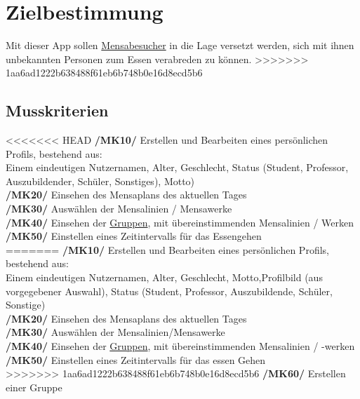 \documentclass[a4paper]{scrreprt}
\begin{document}
\chapter{Zielbestimmung}
Mit dieser App sollen \hyperlink{label1}{Mensabesucher} in die Lage versetzt werden, sich mit ihnen unbekannten Personen zum Essen verabreden zu können.
>>>>>>> 1aa6ad1222b638488f61eb6b748b0e16d8ecd5b6
 
\section{Musskriterien}

\begin{addmargin}[25pt]{0pt} 
<<<<<<< HEAD
\hypertarget{mk10}{\textbf{/MK10/}} Erstellen und Bearbeiten eines persönlichen Profils, bestehend aus: \\ Einem eindeutigen Nutzernamen, Alter, Geschlecht, Status (Student, Professor, Auszubildender, Schüler, Sonstiges), Motto)\\
\hypertarget{mk20}{\textbf{/MK20/}} Einsehen des Mensaplans des aktuellen Tages\\
\hypertarget{mk30}{\textbf{/MK30/}} Auswählen der Mensalinien / Mensawerke\\
\hypertarget{mk40}{\textbf{/MK40/}} Einsehen der \hyperlink{gruppe}{Gruppen}, mit übereinstimmenden Mensalinien / Werken\\
\hypertarget{mk50}{\textbf{/MK50/}} Einstellen eines Zeitintervalls für das Essengehen \\
=======
\hypertarget{mk10}{\textbf{/MK10/}} Erstellen und Bearbeiten eines persönlichen Profils, bestehend aus: \\ Einem eindeutigen Nutzernamen, Alter, Geschlecht, Motto,Profilbild (aus vorgegebener Auswahl), Status (Student, Professor, Auszubildende, Schüler, Sonstige)\\
\hypertarget{mk20}{\textbf{/MK20/}} Einsehen des Mensaplans des aktuellen Tages\\
\hypertarget{mk30}{\textbf{/MK30/}} Auswählen der Mensalinien/Mensawerke\\
\hypertarget{mk40}{\textbf{/MK40/}} Einsehen der \hyperlink{gruppe}{Gruppen}, mit übereinstimmenden Mensalinien / -werken\\
\hypertarget{mk50}{\textbf{/MK50/}} Einstellen eines Zeitintervalls für das essen Gehen \\
>>>>>>> 1aa6ad1222b638488f61eb6b748b0e16d8ecd5b6
\hypertarget{mk60}{\textbf{/MK60/}} Erstellen einer Gruppe\\

\end{addmargin}
\end{document}
